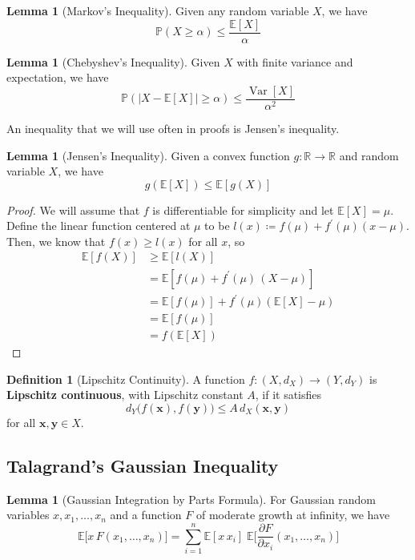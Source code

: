 \documentclass{article}
\DeclareMathOperator{\Var}{Var}
\theoremstyle{definition}
\newtheorem{lemma}[theorem]{Lemma}
\theoremstyle{remark}
\theoremstyle{definition}
\newtheorem{definition}{Definition}[section]
\begin{document}
  \begin{lemma}[Markov's Inequality]
  Given any random variable $X$, we have 
  \[\mathbb{P}(X \geq \alpha) \leq \frac{\mathbb{E}[X]}{\alpha}\]
  \end{lemma}

  \begin{lemma}[Chebyshev's Inequality]
  Given $X$ with finite variance and expectation, we have 
  \[\mathbb{P}(|X - \mathbb{E}[X]| \geq \alpha) \leq \frac{\Var[X]}{\alpha^2}\]
  \end{lemma}

  An inequality that we will use often in proofs is Jensen's inequality. 

  \begin{lemma}[Jensen's Inequality]
  Given a convex function $g: \mathbb{R} \rightarrow \mathbb{R}$ and random variable $X$, we have 
  \[g(\mathbb{E}[X]) \leq \mathbb{E}[g(X)]\]
  \end{lemma}
  \begin{proof}
  We will assume that $f$ is differentiable for simplicity and let $\mathbb{E}[X] = \mu$. Define the linear function centered at $\mu$ to be $l(x) \coloneqq f(\mu) + f^\prime (\mu) (x - \mu)$. Then, we know that $f(x) \geq l(x)$ for all $x$, so 
  \begin{align*}
      \mathbb{E}[f(X)] & \geq \mathbb{E}[ l(X)] \\ 
      & = \mathbb{E}[f(\mu) + f^\prime (\mu) \, (X - \mu)] \\
      & = \mathbb{E}[f(\mu)] + f^\prime (\mu) ( \mathbb{E}[X] - \mu) \\
      & = \mathbb{E}[f(\mu)] \\
      & = f(\mathbb{E}[X])
  \end{align*}
  \end{proof}

  \begin{definition}[Lipschitz Continuity]
  A function $f: (X, d_X) \longrightarrow (Y, d_Y)$ is \textbf{Lipschitz continuous}, with Lipschitz constant $A$, if it satisfies 
  \[d_Y \big( f(\mathbf{x}), f(\mathbf{y})\big) \leq A \, d_X (\mathbf{x}, \mathbf{y})\]
  for all $\mathbf{x}, \mathbf{y} \in X$. 
  \end{definition}

  \subsection{Talagrand's Gaussian Inequality}

  \begin{lemma}[Gaussian Integration by Parts Formula]
  For Gaussian random variables $x, x_1, \ldots, x_n$ and a function $F$ of moderate growth at infinity, we have 
  \[\mathbb{E}\big[ x \, F(x_1, \ldots, x_n) \big] = \sum_{i=1}^n \mathbb{E}[x \, x_i] \; \mathbb{E}\bigg[ \frac{\partial F}{\partial x_i} (x_1, \ldots, x_n) \bigg]\]
  \end{lemma}
\end{document}
